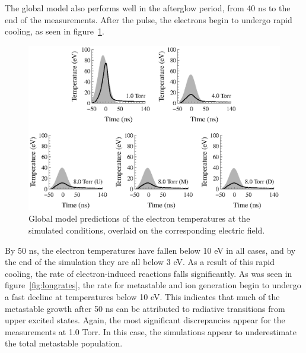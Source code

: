 The global model also performs well in the afterglow period, from 40 ns to the
end of the measurements. After the pulse, the electrons begin to undergo rapid
cooling, as seen in figure~\ref{fig:etemps}.
\begin{figure}
  \centering
  \includegraphics{./chapters/modeling/figures/etemps.eps}
  \caption{Global model predictions of the electron temperatures at the
  simulated conditions, overlaid on the corresponding electric field.}
  \label{fig:etemps}
\end{figure}
By 50 ns, the electron temperatures have fallen below 10 eV in all cases, and by
the end of the simulation they are all below 3 eV. As a result of this rapid
cooling, the rate of electron-induced reactions falls significantly. As was seen
in figure~\ref{fig:longrates}, the rate for metastable and ion generation begin
to undergo a fast decline at temperatures below 10 eV. This indicates that much
of the metastable growth after 50 ns can be attributed to radiative transitions
from upper excited states. Again, the most significant discrepancies appear for
the measurements at 1.0 Torr. In this case, the simulations appear to
underestimate the total metastable population.

